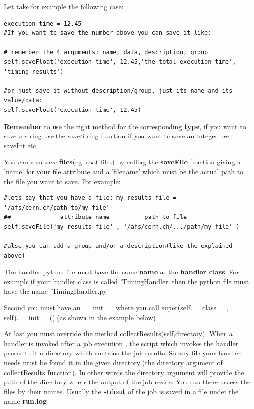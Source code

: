 \documentclass{lhcbnote}
\begin{document}
Let take for example the following case:

\begin{verbatim}
execution_time = 12.45  
#If you want to save the number above you can save it like:

# remember the 4 arguments: name, data, description, group
self.saveFloat('execution_time', 12.45,'the total execution time', 'timing results')
					
#or just save it without description/group, just its name and its value/data:
self.saveFloat('execution_time', 12.45)					
\end{verbatim}

{\bf Remember} to use the right method for the corresponding {\bf type}, if you want to save  a string use the saveString function 
if you want to save an Integer use saveInt etc

You can also save {\bf files}(eg .root files) by calling the {\bf saveFile} function giving a 'name' for your file attribute 
and a 'filename' which must be the actual path to the file you want to save. For example:

\begin{verbatim}
#lets say that you have a file: my_results_file = '/afs/cern.ch/path_to/my_file'
##				attribute name 			path to file
self.saveFile('my_results_file' , '/afs/cern.ch/.../path/my_file' )
					
#also you can add a group and/or a description(like the explained above)
\end{verbatim}

The handler python file must have the same {\bf name} as the {\bf handler class},
For example if your handler class is called 'TimingHandler' then the python file must have the name 'TimingHandler.py'
		
Second you must have an \_\_init\_\_  where you call super(self.\_\_class\_\_, self).\_\_init\_\_() (as shown in the example below)
		
At last you must override the method collectResults(self,directory).
When a handler is invoked after a job execution , the script which invokes the handler passes to it 
a directory which contains the job results. So any file your handler needs must be found it in the given directory (the directory argument of collectResults function). In other words the directory argument will provide the path of the directory where the output of the job reside. You can there access the files by their names. Usually the \textbf{stdout} of the job is saved in a file under the name \textbf{run.log}
		
\end{document}

